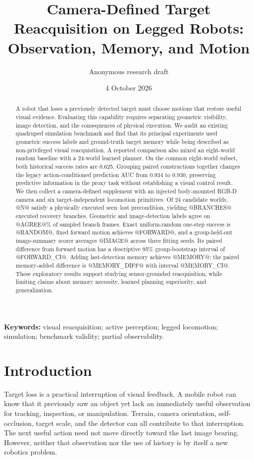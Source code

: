 \documentclass[10pt,twocolumn,a4paper]{article}
\title{Camera-Defined Target Reacquisition on Legged Robots:\\Observation, Memory, and Motion}
\author{Anonymous research draft}
\date{4 October 2026}
\begin{document}
\maketitle
\begin{abstract}
A robot that loses a previously detected target must choose motions that restore useful visual evidence. Evaluating this capability requires separating geometric visibility, image detection, and the consequences of physical execution. We audit an existing quadruped simulation benchmark and find that its principal experiments used geometric success labels and ground-truth target memory while being described as non-privileged visual reacquisition. A reported comparison also mixed an eight-world random baseline with a 24-world learned planner. On the common eight-world subset, both historical success rates are 0.625. Grouping paired constructions together changes the legacy action-conditioned prediction AUC from 0.934 to 0.930, preserving predictive information in the proxy task without establishing a visual control result. We then collect a camera-defined supplement with an injected body-mounted RGB-D camera and six target-independent locomotion primitives. Of 24 candidate worlds, @N@ satisfy a physically executed seen--lost precondition, yielding @BRANCHES@ executed recovery branches. Geometric and image-detection labels agree on @AGREE@\% of sampled branch frames. Exact uniform-random one-step success is @RANDOM@, fixed forward motion achieves @FORWARD@, and a group-held-out image-summary scorer averages @IMAGE@ across three fitting seeds. Its paired difference from forward motion has a descriptive 95\% group-bootstrap interval of @FORWARD_CI@. Adding last-detection memory achieves @MEMORY@; the paired memory-added difference is @MEMORY_DIFF@ with interval @MEMORY_CI@. These exploratory results support studying sensor-grounded reacquisition, while limiting claims about memory necessity, learned planning superiority, and generalization.
\end{abstract}
\noindent\textbf{Keywords:} visual reacquisition; active perception; legged locomotion; simulation; benchmark validity; partial observability.

\section{Introduction}
Target loss is a practical interruption of visual feedback. A mobile robot can know that it previously saw an object yet lack an immediately useful observation for tracking, inspection, or manipulation. Terrain, camera orientation, self-occlusion, target scale, and the detector can all contribute to that interruption. The next useful action need not move directly toward the last image bearing. However, neither that observation nor the use of history is by itself a new robotics problem.
\end{document}
